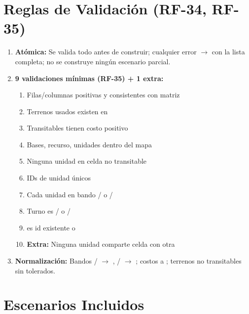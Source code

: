 \section{Reglas de Validación (RF-34, RF-35)}
\label{sec:validacion}

\begin{enumerate}
\item \textbf{Atómica:} Se valida todo antes de construir; cualquier error $\to$
   con la lista completa; no se construye ningún escenario parcial.
\item \textbf{9 validaciones mínimas (RF-35) + 1 extra:}
  \begin{enumerate}
  \item Filas/columnas positivas y consistentes con matriz
  \item Terrenos usados existen en 
  \item Transitables tienen costo positivo
  \item Bases, recurso, unidades dentro del mapa
  \item Ninguna unidad en celda no transitable
  \item IDs de unidad únicos
  \item Cada unidad en bando / o /
  \item Turno es / o /
  \item {} es id existente o 
  \item \textbf{Extra:} Ninguna unidad comparte celda con otra
  \end{enumerate}
\item \textbf{Normalización:} Bandos / $\to$ , / $\to$ ;
  costos a ; terrenos no transitables sin  tolerados.
\end{enumerate}

\section{Escenarios Incluidos}
\label{sec:escenarios-incluidos}

